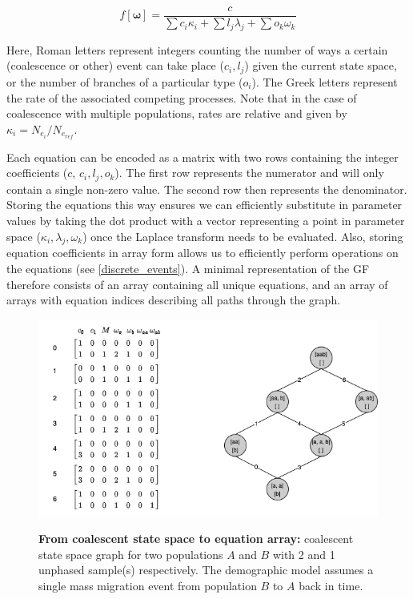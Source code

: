 \documentclass[10pt, a4]{article}
\begin{document}
\begin{equation} \label{eq:general_form}
f[\boldsymbol{\omega}] = \frac{c}{\sum c_i\kappa_i + \sum l_j\lambda_j + \sum o_k \omega_k} 
\end{equation}

Here, Roman letters represent integers counting the number of ways a certain (coalescence or other) event can take place ($c_i, l_j$) given the current state space, or the number of branches of a particular type ($o_i$). The Greek letters represent the rate of the associated competing processes. Note that in the case of coalescence with multiple populations, rates are relative and given by $\kappa_i = N_{e_{i}}/N_{e_{ref}}$.

Each equation can be encoded as a matrix with two rows containing the integer coefficients ($c$, $c_i, l_j, o_k$). The first row represents the numerator and will only contain a single non-zero value. The second row then represents the denominator. Storing the equations this way ensures we can efficiently substitute in parameter values by taking the dot product with a vector representing a point in parameter space ($\kappa_i, \lambda_j, \omega_k$) once the Laplace transform needs to be evaluated. Also, storing equation coefficients in array form allows us to efficiently perform operations on the equations (see \ref{discrete_events}). A minimal representation of the GF therefore consists of an array containing all unique equations, and an array of arrays with equation indices describing all paths through the graph. 

\begin{figure}
\begin{center}
\includegraphics[scale=0.5]{figures/temp2b.png} \label{fig:graph}
\end{center}
\caption{\textbf{From coalescent state space to equation array:} coalescent state space graph for two populations $A$ and $B$ with 2 and 1 unphased sample(s) respectively. The demographic model assumes a single mass migration event from population $B$ to $A$ back in time.}
\end{figure}
\end{document}

